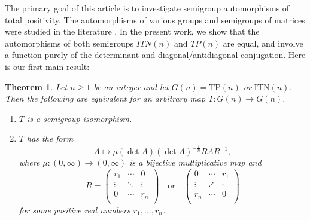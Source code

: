 \documentclass[11pt,reqno]{amsart}
\theoremstyle{plain}
\newtheorem{utheorem}{\textrm{\textbf{Theorem}}}
\theoremstyle{definition}
\numberwithin{equation}{section}
\begin{document}
The primary goal of this article is to investigate semigroup automorphisms of total positivity. The automorphisms of various groups and semigroups of matrices were studied in  the literature \cite{ALMS06,CFL02}.  In the present work, we show that the automorphisms of both semigroups $ITN(n)$ and $TP(n)$ %
are equal, and involve a function purely of the determinant and diagonal/antidiagonal conjugation. Here is our first main result:

\begin{utheorem} \label{multiplicative}Let $n\geq 1$ be an integer and let $G(n) = \text{TP}(n)$ or $\text{ITN}(n)$. Then the following are equivalent for an arbitrary map $T : G(n) \to G(n)$.
	\begin{enumerate}
		\item[(i)] $T$ is a semigroup isomorphism.
		\item[(ii)] $T$ has the form 
		\[A \mapsto \mu(\det A)(\det A)^{-\frac{1}{n}} RAR^{-1},\]
		where $\mu: (0, \infty) \to (0, \infty)$ is a bijective  multiplicative map and 
		\[R=\begin{pmatrix}
			r_1 & \cdots & 0 \\
			\vdots & \ddots & \vdots \\
			0 & \cdots & r_n \\
		\end{pmatrix} \quad \text{or} \quad \begin{pmatrix}
		0 & \cdots & r_1 \\
		\vdots & \iddots & \vdots \\
		r_n & \cdots & 0 \\
		\end{pmatrix}\]
		for some positive real numbers $r_1, \dots, r_n$.
	\end{enumerate}
\end{utheorem}
\end{document}
